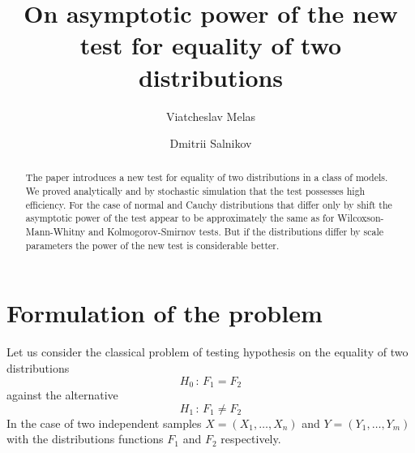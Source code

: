 \documentclass{svproc}
\begin{document}

\mainmatter              %

\title{On asymptotic power of the new test for equality of two distributions}

\author{Viatcheslav Melas \and Dmitrii Salnikov}



\maketitle              %

\begin{abstract}
The paper introduces a new test for equality of two distributions in a class of models.  We proved analytically and by stochastic simulation that the test possesses high efficiency. For the case of normal and Cauchy distributions that differ only by shift the asymptotic power of the test appear to be approximately the same as for Wilcoxson-Mann-Whitny and Kolmogorov-Smirnov tests. But if the distributions differ by scale parameters the power of the new test is considerable better.

\end{abstract}





\section{Formulation of the problem}
\label{S:1}
Let us consider the classical problem of testing hypothesis on the equality of two distributions
\begin{equation}
  \label{H0}
  H_0\,:\,F_1 = F_2
\end{equation}
against the alternative
\begin{equation}
  \label{H1}
  H_1\,:\,F_1 \not= F_2
\end{equation}
In the case of two independent samples $X=(X_{1},\ldots, X_{n})$ and $Y=(Y_{1},\ldots, Y_{m})$ with the distributions functions $F_1$ and $F_2$ respectively.
\end{document}
